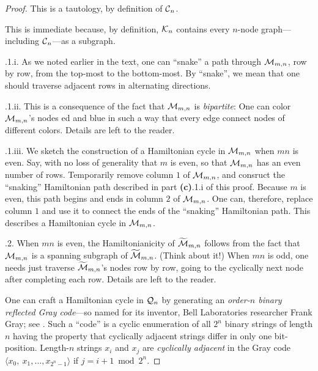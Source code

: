 \begin{proof}
This is a tautology, by definition of $\mbox{$\cal C$}_n$.

\medskip

This is immediate because, by definition, $\mbox{$\cal K$}_n$ contains every
$n$-node graph---including $\mbox{$\cal C$}_n$---as a subgraph.

\medskip

.1.i.
As we noted earlier in the text, one can ``snake'' a path through
$\mbox{$\cal M$}_{m,n}$, row by row, from the top-most to the bottom-most.  By
``snake'', we mean that one should traverse adjacent rows in
alternating directions.

.1.ii.
This is a consequence of the fact that $\mbox{$\cal M$}_{m,n}$ is {\it bipartite}:
 One can color $\mbox{$\cal M$}_{m,n}$'s nodes ed and blue
in such a way that every edge connect nodes of different colors.
Details are left to the reader.

.1.iii.
We sketch the construction of a Hamiltonian cycle in $\mbox{$\cal M$}_{m,n}$ when
$mn$ is even.  Say, with no loss of generality that $m$ is even, so
that $\mbox{$\cal M$}_{m,n}$ has an even number of rows.  Temporarily remove column
$1$ of $\mbox{$\cal M$}_{m,n}$, and consruct the ``snaking'' Hamiltonian path
described in part {\bf (c)}.1.i of this proof.  Because $m$ is even,
this path begins and ends in column $2$ of $\mbox{$\cal M$}_{m,n}$.  One can,
therefore, replace column $1$ and use it to connect the ends of the
``snaking'' Hamiltonian path.  This describes a Hamiltonian cycle in
$\mbox{$\cal M$}_{m,n}$.

.2.
When $mn$ is even, the Hamiltonianicity of $\widetilde{\mbox{$\cal M$}}_{m,n}$
follows from the fact that $\mbox{$\cal M$}_{m,n}$ is a spanning subgraph of
$\widetilde{\mbox{$\cal M$}}_{m,n}$.  (Think about it!)  When $mn$ is odd, one
needs just traverse $\widetilde{\mbox{$\cal M$}}_{m,n}$'s nodes row by row, going
to the cyclically next node after completing each row.  Details are
left to the reader.

\medskip

One can craft a Hamiltonian cycle in $\mbox{$\cal Q$}_n$ by
generating an {\it order-$n$ binary reflected Gray code}---so named
for its inventor, Bell Laboratories researcher 
Frank Gray; see \cite{PetersonW81}.    Such a ``code'' is a cyclic enumeration of all
$2^n$ binary strings of length $n$ having the property that cyclically
adjacent  strings differ in only
one bit-position.  Length-$n$ strings $x_i$ and $x_j$ are {\it
  cyclically adjacent} in the Gray code $\langle x_0, \ x_1, \ldots,
x_{2^n-1} \rangle$ if $j = i+1 \bmod 2^n$.


\end{proof}
